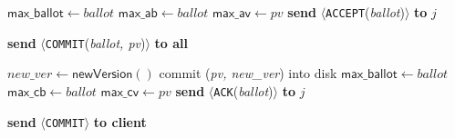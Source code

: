 \begin{algorithm*}
\begin{multicols}{2}
\begin{algorithmic}[1]
        \columnbreak

                \State $\mathsf{max\_ballot}\gets ballot$\;
                \State $\mathsf{max\_ab}\gets ballot$\;
                \State $\mathsf{max\_av}\gets pv$\;
                \State \textbf{send} $\langle$\texttt{ACCEPT}(\textit{ballot})$\rangle$ \textbf{to} $j$
            \EndIf
        \ENDR

            \State \textbf{send} $\langle$\texttt{COMMIT}(\textit{ballot, pv})$\rangle$ \textbf{to all}
        \ENDRQ

                \State $new\_ver \gets \mathsf{newVersion()}$\;
                \State commit (\textit{pv, new\_ver}) into disk\;
                \State $\mathsf{max\_ballot}\gets ballot$\;
                \State $\mathsf{max\_cb}\gets ballot$\;
                \State $\mathsf{max\_cv}\gets pv$\;
                \State \textbf{send} $\langle$\texttt{ACK}(\textit{ballot})$\rangle$ \textbf{to} $j$\;
            \EndIf
        \ENDR

            \State \textbf{send} $\langle$\texttt{COMMIT}$\rangle$ \textbf{to client}
        \ENDRQ
        \end{algorithmic}
    \end{multicols}
\end{algorithm*}
